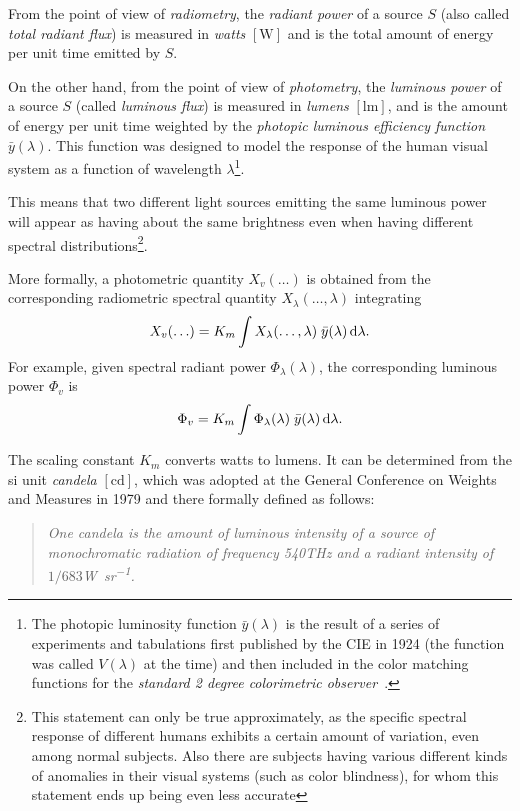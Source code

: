 From the point of view of \textsl{\gls{radiometry}}, the \textsl{radiant power} of a
source $S$
(also called \textsl{total radiant flux}) is measured in
\textit{watts} $[\unit{\watt}]$ and is the total amount of energy per unit time
emitted by $S$.

On the other hand, from the point of view of \textsl{\gls{photometry}}, the
\textsl{luminous power}
of a source $S$ (called \textsl{luminous flux}) is measured in
\textit{lumens} $[\unit{\lumen}]$, and is the amount of energy per unit time
weighted by the \textsl{photopic luminous efficiency function} $\bar y(\lambda)$. 
This function was designed to model the response of the human visual system as a function of wavelength $\lambda$\footnote{
	The photopic luminosity function $\bar y(\lambda)$ is the result of a series of experiments and tabulations first published by the \gls{CIE} in 1924 (the function was called $V(\lambda)$ at the time) and then included in the color matching functions for the \emph{standard 2 degree colorimetric observer}~\parencite{smithgould1931}.}.

This means that two different light sources emitting the same luminous
power will appear as having about the same brightness even when having
different spectral distributions\footnote{This
statement can only be true approximately, as the specific spectral response
of different humans exhibits a certain amount of variation, even among
normal subjects.
Also there are subjects having various different kinds of anomalies in their
visual systems (such as color blindness), for whom this statement ends up being even less accurate}.

More formally, a photometric quantity $X_v(\ldots)$ is obtained from 
the corresponding radiometric spectral quantity $X_{\lambda}(\ldots, \lambda)$
integrating
\begin{equation}
X_v(\ldots) = K_m \int X_{\lambda}(\ldots,\lambda)\; \bar y (\lambda) \mathop{}\!\mathrm{d}\lambda.
\label{eqn:rad_to_photo}
\end{equation}
For example, given spectral radiant power $\Phi_{\lambda}(\lambda)$, the
corresponding
luminous power $\Phi_v$ is
\begin{displaymath}
\Phi_v = K_m \int \Phi_{\lambda}(\lambda)\; \bar y(\lambda) \mathop{}\!\mathrm{d}\lambda.
\end{displaymath}

The scaling constant $K_m$ converts watts to lumens. It can be determined
from the 
\gls{si} unit \textsl{candela} $[\unit{\candela}]$, which was adopted at
the General Conference on Weights and Measures in 1979 and
there formally defined as follows:
\begin{quote}
\emph{One candela is the amount of luminous intensity of a source of
monochromatic radiation of frequency \num{540}\unit{\tera\hertz} and
a radiant intensity of $1/683$\unit{\watt\per\steradian}.}
\end{quote}

